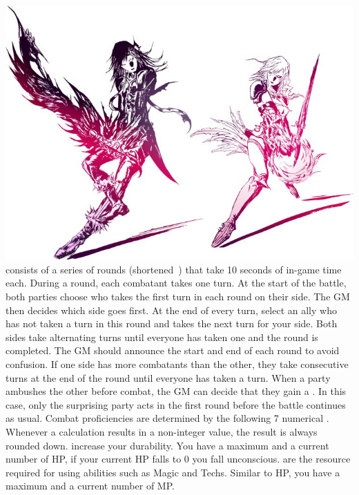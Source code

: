 %
\\
%
\includegraphics[width=\columnwidth]{./art/images/ff13-2.jpg}
%
\vfill
%
 consists of a series of rounds (shortened~) that take 10 seconds of in-game time each.
During a round, each combatant takes one turn.
At the start of the battle, both parties choose who takes the first turn in each round on their side.
The GM then decides which side goes first.
At the end of every turn, select an ally who has not taken a turn in this round and takes the next turn for your side.
Both sides take alternating turns until everyone has taken one and the round is completed.
The GM should announce the start and end of each round to avoid confusion.
If one side has more combatants than the other, they take consecutive turns at the end of the round until everyone has taken a turn.
When a party ambushes the other before combat, the GM can decide that they gain a .
In this case, only the surprising party acts in the first round before the battle continues as usual.
%
\vfill
%
Combat proficiencies are determined by the following 7 numerical .
Whenever a calculation results in a non-integer value, the result is always rounded down.
%
\ofgap
%
 increase your durability. You have a maximum and a current number of HP, if your current HP falls to 0 you fall unconscious. \ofrow
{} are the resource required for using abilities such as Magic and Techs. Similar to HP, you have a maximum and a current number of MP. \ofrow
